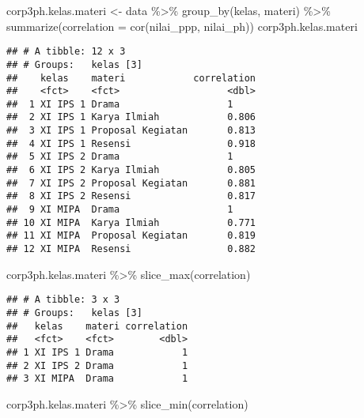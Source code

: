 \documentclass[
]{article}
\newenvironment{Shaded}{\begin{snugshade}}{\end{snugshade}}
\newcommand{\AttributeTok}[1]{\textcolor[rgb]{0.77,0.63,0.00}{#1}}
\newcommand{\FunctionTok}[1]{\textcolor[rgb]{0.00,0.00,0.00}{#1}}
\newcommand{\NormalTok}[1]{#1}
\newcommand{\OtherTok}[1]{\textcolor[rgb]{0.56,0.35,0.01}{#1}}
\newcommand{\SpecialCharTok}[1]{\textcolor[rgb]{0.00,0.00,0.00}{#1}}
\begin{document}
\begin{Shaded}
\begin{Highlighting}[]
\NormalTok{corp3ph.kelas.materi }\OtherTok{\textless{}{-}}\NormalTok{ data }\SpecialCharTok{\%\textgreater{}\%} 
  \FunctionTok{group\_by}\NormalTok{(kelas, materi) }\SpecialCharTok{\%\textgreater{}\%} 
  \FunctionTok{summarize}\NormalTok{(}\AttributeTok{correlation =} \FunctionTok{cor}\NormalTok{(nilai\_ppp, nilai\_ph))}
\NormalTok{corp3ph.kelas.materi}
\end{Highlighting}
\end{Shaded}

\begin{verbatim}
## # A tibble: 12 x 3
## # Groups:   kelas [3]
##    kelas    materi            correlation
##    <fct>    <fct>                   <dbl>
##  1 XI IPS 1 Drama                   1    
##  2 XI IPS 1 Karya Ilmiah            0.806
##  3 XI IPS 1 Proposal Kegiatan       0.813
##  4 XI IPS 1 Resensi                 0.918
##  5 XI IPS 2 Drama                   1    
##  6 XI IPS 2 Karya Ilmiah            0.805
##  7 XI IPS 2 Proposal Kegiatan       0.881
##  8 XI IPS 2 Resensi                 0.817
##  9 XI MIPA  Drama                   1    
## 10 XI MIPA  Karya Ilmiah            0.771
## 11 XI MIPA  Proposal Kegiatan       0.819
## 12 XI MIPA  Resensi                 0.882
\end{verbatim}

\begin{Shaded}
\begin{Highlighting}[]
\NormalTok{corp3ph.kelas.materi }\SpecialCharTok{\%\textgreater{}\%} \FunctionTok{slice\_max}\NormalTok{(correlation)}
\end{Highlighting}
\end{Shaded}

\begin{verbatim}
## # A tibble: 3 x 3
## # Groups:   kelas [3]
##   kelas    materi correlation
##   <fct>    <fct>        <dbl>
## 1 XI IPS 1 Drama            1
## 2 XI IPS 2 Drama            1
## 3 XI MIPA  Drama            1
\end{verbatim}

\begin{Shaded}
\begin{Highlighting}[]
\NormalTok{corp3ph.kelas.materi }\SpecialCharTok{\%\textgreater{}\%} \FunctionTok{slice\_min}\NormalTok{(correlation)}
\end{Highlighting}
\end{Shaded}
\end{document}
